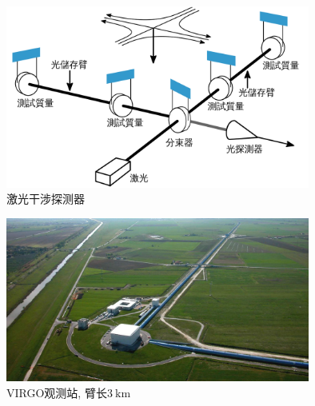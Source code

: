 \documentclass[hidelinks]{ctexart}
\begin{document}
\begin{figure}[ht]
    \centering
    \includegraphics[width=10cm]{src/langzh-1125px-LIGO_schematic_(multilang).png}
    \caption{激光干涉探测器}
    \label{fig:激光干涉探测器}
\end{figure}

\begin{figure}[ht]
    \centering
    \includegraphics[width=10cm]{src/ligoandvirgo.jpg}
    \caption{VIRGO观测站, 臂长$\SI{3}{\kilo\meter}$}
    \label{fig:VIRGO观测站}
\end{figure}
\end{document}
